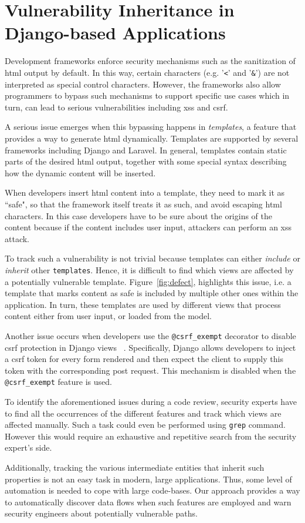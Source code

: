 
\section{Vulnerability Inheritance in Django-based Applications}
\label{sec:motivation}

Development frameworks enforce security mechanisms such as the 
sanitization of {\sc html} output by default.
In this way, certain characters
(e.g. '{\tt <}' and '{\tt \&}')
are not interpreted as special
control characters.
However,
the frameworks also
allow programmers to
bypass such mechanisms to support
specific use cases which 
in turn, can lead to serious
vulnerabilities including {\sc xss} and {\sc csrf}.

A serious issue emerges when this bypassing
happens in {\it templates}, 
a feature that provides a way to generate {\sc html} dynamically.
Templates are supported by several frameworks
including Django and Laravel.
In general,
templates contain static parts of the 
desired {\sc html} output,
together with some special 
syntax describing how the dynamic
content will be inserted.

When developers insert
{\sc html} content into a template,
they need to mark it as ``safe", 
so that the framework itself
treats it as such, 
and avoid escaping {\sc html} characters.
In this case developers have to be sure about the
origins of the content
because if the content 
includes user input,
attackers can perform an 
{\sc xss} attack.

To track such a vulnerability is not trivial
because templates can either
{\it include} or {\it inherit}
other {\tt templates}.
Hence,
it is difficult to find which
views are affected
by a potentially vulnerable template.
Figure~\ref{fig:defect},
highlights this issue,
i.e. a template that marks content
as safe is included by multiple other
ones within the application.
In turn, 
these templates are used by different 
views that process content either from user 
input, or loaded from the model. 

Another issue occurs when
developers use the 
{\tt @csrf\_exempt} decorator to disable 
{\sc csrf} protection in Django
views ~\cite{csrf_exempt}.
Specifically,
Django allows developers to
inject a {\sc csrf} token 
for every form rendered and then
expect the client 
to supply this token with the
corresponding {\sc post}  request.
This mechanism is disabled when the {\tt @csrf\_exempt} 
feature is used.

To identify the aforementioned issues
during a code review,
security experts have to find all
the occurrences 
of the different features and
track which views are affected manually.
Such a task could even be performed
using {\tt grep} command.
However this would require an
exhaustive  and repetitive search
from the security expert's side.

Additionally, 
tracking the various intermediate entities that inherit 
such properties is not an easy task in modern,
large applications. 
Thus,
some level of automation is
needed to cope with 
large code-bases.
Our approach provides a way to
automatically discover 
data flows when such features
are employed and 
warn security engineers
about potentially vulnerable paths.